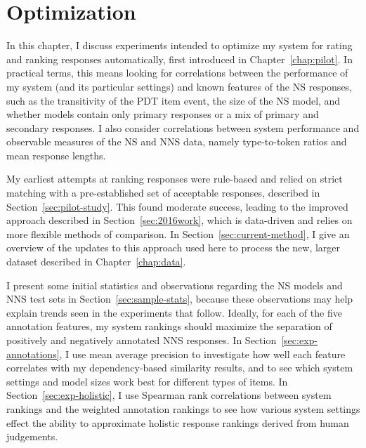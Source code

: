 \chapter{Optimization}
\label{chap:optimization}
In this chapter, I discuss experiments intended to optimize my system for rating and ranking responses automatically, first introduced in Chapter~\ref{chap:pilot}. In practical terms, this means looking for correlations between the performance of my system (and its particular settings) and known features of the NS responses, such as the transitivity of the PDT item event, the size of the NS model, and whether models contain only primary responses or a mix of primary and secondary responses. I also consider correlations between system performance and observable measures of the NS and NNS data, namely type-to-token ratios and mean response lengths.

My earliest attempts at ranking responses were rule-based and relied on strict matching with a pre-established set of acceptable responses, described in Section~\ref{sec:pilot-study}. This found moderate success, leading to the improved approach described in Section~\ref{sec:2016work}, which is data-driven and relies on more flexible methods of comparison.
In Section~\ref{sec:current-method}, I give an overview of the updates to this approach used here to process the new, larger dataset described in Chapter~\ref{chap:data}.

I present some initial statistics and observations regarding the NS models and NNS test sets in Section~\ref{sec:sample-stats}, because these observations may help explain trends seen in the experiments that follow.
Ideally, for each of the five annotation features, my system rankings should maximize the separation of positively and negatively annotated NNS responses.
In Section~\ref{sec:exp-annotations}, I use mean average precision to investigate how well each feature correlates with my dependency-based similarity results, and to see which system settings and model sizes work best for different types of items. In Section~\ref{sec:exp-holistic}, I use Spearman rank correlations between system rankings and the weighted annotation rankings to see how various system settings effect the ability to approximate holistic response rankings derived from human judgements.


